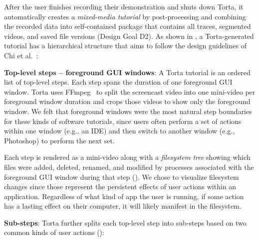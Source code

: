 After the user finishes recording their demonstration and shuts down
Torta, it automatically creates a \emph{mixed-media tutorial} by
post-processing and combining the recorded data  into self-contained
package that contains all traces, segmented videos, and saved file
versions (Design Goal D2). As shown in , a
Torta-generated tutorial has a hierarchical structure that aims to
follow the design guidelines of Chi et al.~\cite{Chi2012}:


\textbf{Top-level steps -- foreground GUI windows}: A Torta tutorial is
an ordered list of top-level steps. Each step spans the duration of one
foreground GUI window. Torta uses FFmpeg~\cite{ffmpeg} to split the screencast video into
one mini-video per foreground window duration and crops those videos to
show only the foreground window. We felt that foreground windows were
the most natural step boundaries for these kinds of software
tutorials, since users often perform a set of actions within one window
(e.g., an IDE) and then switch to another window (e.g., Photoshop) to
perform the next set.

Each step is rendered as a mini-video along with a \emph{filesystem
tree} showing which files were added, deleted, renamed, and modified by
processes associated with the foreground GUI window during that step
(). We chose to visualize filesystem changes since
those represent the persistent effects of user actions within an
application. Regardless of what kind of app the user is running, if some
action has a lasting effect on their computer, it will likely manifest
in the filesystem.


\textbf{Sub-steps}: Torta further splits each top-level step into
sub-steps based on two common kinds of user actions
():

